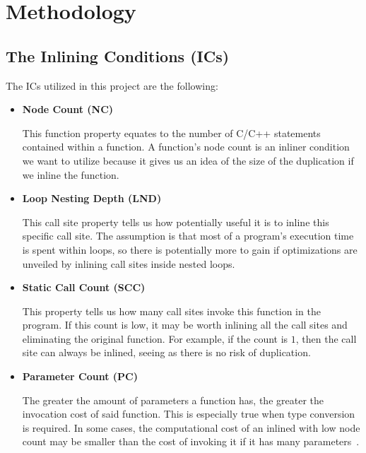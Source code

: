 
\clearpage
\section{Methodology}
\label{sec:methodology}


\subsection{The Inlining Conditions (ICs)}
\label{sub:meth:inlining_conditions}

The ICs utilized in this project are the following:

\begin{itemize}

	\item \textbf{Node Count (NC)}

This function property equates to the number of C/C++ statements contained
within a function. A function's node count is an inliner condition we want
to utilize because it gives us an idea of the size of the  duplication if we
inline the function.

	\item \textbf{Loop Nesting Depth (LND)}

This call site property tells us how potentially useful it is to inline this
specific call site. The assumption is that most of a program's execution time is
spent within loops, so there is potentially more to gain if optimizations are
unveiled by inlining call sites inside nested loops.

	\item \textbf{Static Call Count (SCC)}

This property tells us how many call sites invoke this function in the program.
If this count is low, it may be worth inlining all the call sites and
eliminating the original function. For example, if the count is $1$, then the
call site can always be inlined, seeing as there is no risk of  duplication.

	\item \textbf{Parameter Count (PC)}

The greater the amount of parameters a function has, the greater the invocation
cost of said function. This is especially true when type conversion is required.
In some cases, the computational cost of an inlined with low node count may
be smaller than the cost of invoking it if it has many
parameters~\cite{AdaptvCompilAndInlingWaterman}.


\end{itemize}
